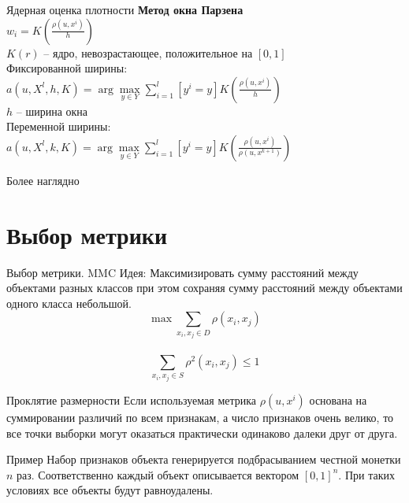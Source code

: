 \documentclass[10pt]{beamer}
\begin{document}
\begin{frame}{Ядерная оценка плотности}
	\textbf{Метод окна Парзена}\\
	${w_i = K(\frac{\rho(u, x^i)}{h})}$\\
	$K(r)$ -- ядро, невозрастающее, положительное на ${[0, 1]}$\\
  \bigbreak
	Фиксированной ширины:\\
	${a(u, X^l, h, K) = \arg\max\limits_{y \in Y} \sum\limits_{i=1}^l [y^i = y] K(\frac{\rho(u, x^i)}{h})}$\\
	$h$ -- ширина окна\\
  \bigbreak
	Переменной ширины:\\
	${a(u, X^l, k, K) = \arg\max\limits_{y \in Y} \sum\limits_{i=1}^l [y^i = y] K(\frac{\rho(u, x^i)}{\rho(u, x^{k+1})})}$
\end{frame}

\begin{frame}{Более наглядно}
\end{frame}

\section{Выбор метрики}

\begin{frame}{Выбор метрики. MMC}
	\alert{Идея}: Максимизировать сумму расстояний между объектами разных классов
	при этом сохраняя сумму расстояний между объектами одного класса небольшой.\\
	\bigbreak
	$${\max \sum\limits_{x_i, x_j \in D} \rho(x_i, x_j) }$$\\
	\bigbreak
	$${\sum\limits_{x_i, x_j \in S} \rho^2(x_i, x_j) \leq 1 }$$
\end{frame}

\begin{frame}{Проклятие размерности}
	Если используемая метрика ${\rho(u, x^i)}$ основана на суммировании различий по всем признакам, а число признаков очень велико,
	то все точки выборки могут оказаться практически одинаково далеки друг от друга.\\
\end{frame}

\begin{frame}{Пример}
	Набор признаков объекта генерируется подбрасыванием честной монетки $n$ раз. Соответственно
	каждый объект описывается вектором $[0, 1]^n$. При таких условиях все объекты будут равноудалены.
\end{frame}
\end{document}
